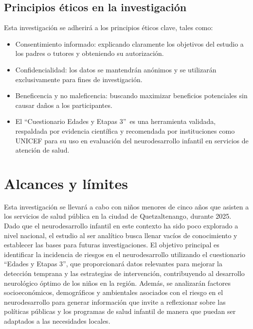 \documentclass[11pt,letterpaper]{report}
\newcommand{\asq}{“Cuestionario Edades y Etapas 3”}
\begin{document}
\section{Principios éticos en la investigación}
Esta investigación se adherirá a los principios éticos clave, tales como:
\begin{itemize}
	\item Consentimiento informado: explicando claramente los objetivos del
	estudio a los padres o tutores y obteniendo su autorización.

	\item Confidencialidad: los datos se mantendrán anónimos y se utilizarán 
	exclusivamente para fines de investigación.

	\item Beneficencia y no maleficencia: buscando maximizar beneficios
	potenciales sin causar daños a los participantes.

	\item El \asq\ es una herramienta validada, respaldada por evidencia
	científica y recomendada por instituciones como UNICEF para su uso en
	evaluación del neurodesarrollo infantil en servicios de atención de
	salud. \cite{UNICEFrespaldo}
\end{itemize}

	\chapter{Alcances y límites}
Esta investigación se llevará a cabo con niños menores de cinco años que
asisten a los servicios de salud pública en la ciudad de Quetzaltenango,
durante 2025. Dado que el neurodesarrollo infantil en este contexto ha sido
poco explorado a nivel nacional, el estudio al ser analítico busca llenar
vacíos de conocimiento y establecer las bases para futuras investigaciones. El
objetivo principal es identificar la incidencia de riesgos en el
neurodesarrollo
utilizando el cuestionario “Edades y Etapas 3”, que proporcionará datos
relevantes para mejorar la detección temprana y las estrategias de
intervención, contribuyendo al desarrollo neurológico óptimo de los niños en la
región. Además, se analizarán factores socioeconómicos, demográficos y
ambientales asociados con el riesgo en el neurodesarrollo para generar
información que invite a reflexionar sobre las políticas públicas y los
programas de salud infantil de manera que puedan ser adaptados a las
necesidades locales.
\end{document}
